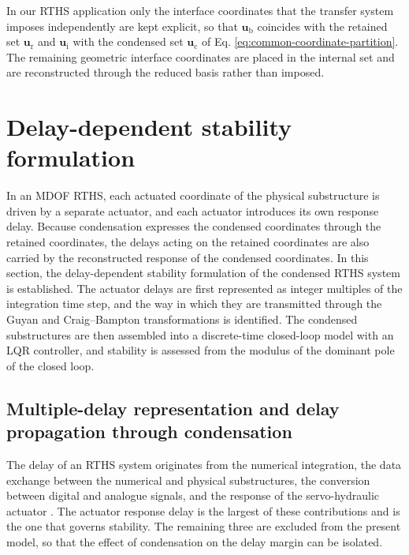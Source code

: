 \documentclass[11pt,a4paper]{article}
\numberwithin{equation}{section}
\begin{document}
In our RTHS application only the interface coordinates that the transfer system imposes independently are kept explicit, so that \(\bm{u}_{\mathrm{b}}\) coincides with the retained set \(\bm{u}_{\mathrm{r}}\) and \(\bm{u}_{\mathrm{i}}\) with the condensed set \(\bm{u}_{\mathrm{c}}\) of Eq. \eqref{eq:common-coordinate-partition}. The remaining geometric interface coordinates are placed in the internal set and are reconstructed through the reduced basis rather than imposed.




\section{Delay-dependent stability formulation} \label{sec3}

In an MDOF RTHS, each actuated coordinate of the physical substructure is driven by a separate actuator, and each actuator introduces its own response delay. Because condensation expresses the condensed coordinates through the retained coordinates, the delays acting on the retained coordinates are also carried by the reconstructed response of the condensed coordinates. In this section, the delay-dependent stability formulation of the condensed RTHS system is established. The actuator delays are first represented as integer multiples of the integration time step, and the way in which they are transmitted through the Guyan and Craig--Bampton transformations is identified. The condensed substructures are then assembled into a discrete-time closed-loop model with an LQR controller, and stability is assessed from the modulus of the dominant pole of the closed loop.

\subsection{Multiple-delay representation and delay propagation through condensation}
\label{sec:multiple-delay}

The delay of an RTHS system originates from the numerical integration, the data exchange between the numerical and physical substructures, the conversion between digital and analogue signals, and the response of the servo-hydraulic actuator \cite{Carrion2007}. The actuator response delay is the largest of these contributions and is the one that governs stability. The remaining three are excluded from the present model, so that the effect of condensation on the delay margin can be isolated.
\end{document}
